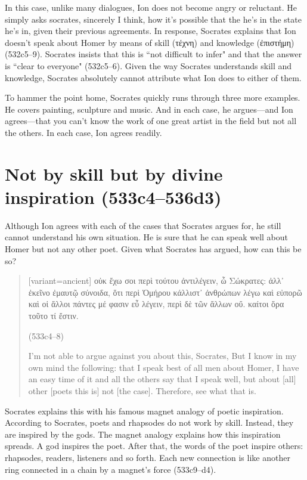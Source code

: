 \documentclass[11pt,letterpaper]{article}
\begin{document}
In this case, unlike many dialogues, Ion does not become angry or reluctant. He simply asks socrates, sincerely I think, how it's possible that the he's in the state he's in, given their previous agreements. In response, Socrates explains that Ion doesn't speak about Homer by means of skill (\textgreek{τέχνη}) and knowledge (\textgreek{ἐπιστήμη}) (532c5--9). Socrates insists that this is ``not difficult to infer" and that the answer is ``clear to everyone" (532c5--6). Given the way Socrates understands skill and knowledge, Socrates absolutely cannot attribute what Ion does to either of them.

To hammer the point home, Socrates quickly runs through three more examples.  He covers painting, sculpture and music. And in each case, he argues---and Ion agrees---that you can't know the work of one great artist in the field but not all the others. In each case, Ion agrees readily.


\section{Not by skill but by divine inspiration (533c4--536d3)}

Although Ion agrees with each of the cases that Socrates argues for, he still cannot understand his own situation. He is sure that he can speak well about Homer but not any other poet. Given what Socrates has argued, how can this be so?

\begin{quote}
    \begin{greek}[variant=ancient]
    οὐκ ἔχω σοι περὶ τούτου ἀντιλέγειν, ὦ Σώκρατες: ἀλλ᾽ ἐκεῖνο ἐμαυτῷ σύνοιδα, ὅτι περὶ Ὁμήρου κάλλιστ᾽ ἀνθρώπων λέγω καὶ εὐπορῶ καὶ οἱ ἄλλοι πάντες μέ φασιν εὖ λέγειν, περὶ δὲ τῶν ἄλλων οὔ. καίτοι ὅρα τοῦτο τί ἔστιν.
    \end{greek} (533c4--8)

    I'm not able to argue against you about this, Socrates, But I know in my own mind the following: that I speak best of all men about Homer, I have an easy time of it and all the others say that I speak well, but about [all] other [poets this is] not [the case]. Therefore, see what that is.
\end{quote}

Socrates explains this with his famous magnet analogy of poetic inspiration. According to Socrates, poets and rhapsodes do not work by skill. Instead, they are inspired by the gods. The magnet analogy explains how this inspiration spreads. A god inspires the poet. After that, the words of the poet inspire others: rhapsodes, readers, listeners and so forth. Each new connection is like another ring connected in a chain by a magnet's force (533c9--d4).
\end{document}
